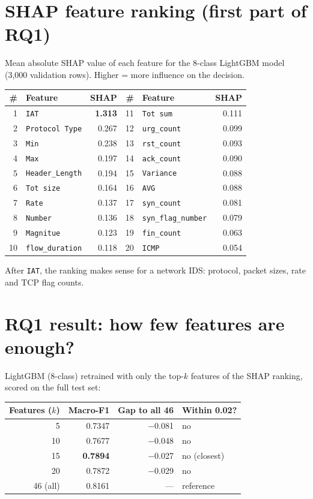 \documentclass[11pt]{article}
\begin{document}
\section{SHAP feature ranking (first part of RQ1)}
Mean absolute SHAP value of each feature for the 8-class LightGBM model (3,000 validation rows). Higher = more influence on the decision.

\begin{center}
\begin{tabular}{@{}r l r @{\hspace{1.2cm}} r l r@{}}
\toprule
\textbf{\#} & \textbf{Feature} & \textbf{SHAP} & \textbf{\#} & \textbf{Feature} & \textbf{SHAP} \\
\midrule
1 & \texttt{IAT} & \textbf{1.313} & 11 & \texttt{Tot sum} & 0.111 \\
2 & \texttt{Protocol Type} & 0.267 & 12 & \texttt{urg\_count} & 0.099 \\
3 & \texttt{Min} & 0.238 & 13 & \texttt{rst\_count} & 0.093 \\
4 & \texttt{Max} & 0.197 & 14 & \texttt{ack\_count} & 0.090 \\
5 & \texttt{Header\_Length} & 0.194 & 15 & \texttt{Variance} & 0.088 \\
6 & \texttt{Tot size} & 0.164 & 16 & \texttt{AVG} & 0.088 \\
7 & \texttt{Rate} & 0.137 & 17 & \texttt{syn\_count} & 0.081 \\
8 & \texttt{Number} & 0.136 & 18 & \texttt{syn\_flag\_number} & 0.079 \\
9 & \texttt{Magnitue} & 0.123 & 19 & \texttt{fin\_count} & 0.063 \\
10 & \texttt{flow\_duration} & 0.118 & 20 & \texttt{ICMP} & 0.054 \\
\bottomrule
\end{tabular}
\end{center}
After \texttt{IAT}, the ranking makes sense for a network IDS: protocol, packet sizes, rate and TCP flag counts.

\newpage
\section{RQ1 result: how few features are enough?}
LightGBM (8-class) retrained with only the top-$k$ features of the SHAP ranking, scored on the full test set:

\begin{center}
\begin{tabular}{@{}r r r l@{}}
\toprule
\textbf{Features ($k$)} & \textbf{Macro-F1} & \textbf{Gap to all 46} & \textbf{Within 0.02?} \\
\midrule
5  & 0.7347 & $-$0.081 & no \\
10 & 0.7677 & $-$0.048 & no \\
15 & \textbf{0.7894} & $-$0.027 & no (closest) \\
20 & 0.7872 & $-$0.029 & no \\
46 (all) & 0.8161 & --- & reference \\
\bottomrule
\end{tabular}
\end{center}
\end{document}
